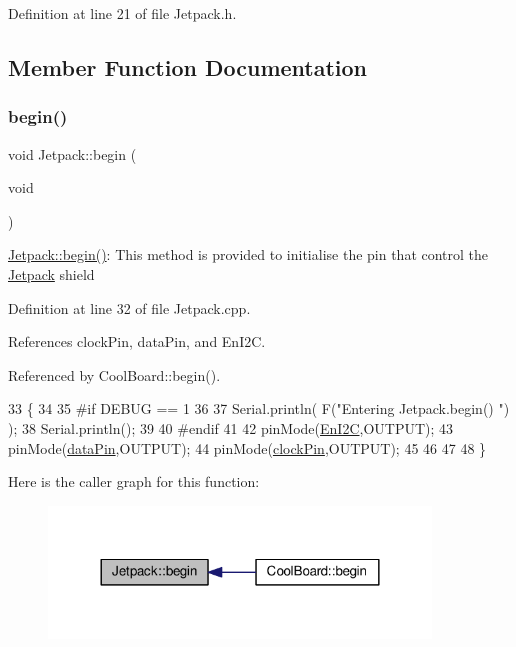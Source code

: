 Definition at line 21 of file Jetpack.\+h.



\subsection{Member Function Documentation}
\mbox{\label{classJetpack_a5a53e1ebf7aaf3bf3e0d37ea64ca09a7}} 
\subsubsection{\texorpdfstring{begin()}{begin()}}
{\footnotesize\ttfamily void Jetpack\+::begin (\begin{DoxyParamCaption}\item[{void}]{ }\end{DoxyParamCaption})}

\hyperlink{classJetpack_a5a53e1ebf7aaf3bf3e0d37ea64ca09a7}{Jetpack\+::begin()}\+: This method is provided to initialise the pin that control the \hyperlink{classJetpack}{Jetpack} shield 

Definition at line 32 of file Jetpack.\+cpp.



References clock\+Pin, data\+Pin, and En\+I2C.



Referenced by Cool\+Board\+::begin().


\begin{DoxyCode}
33 \{
34 
35 \textcolor{preprocessor}{#if DEBUG == 1 }
36  
37     Serial.println( F(\textcolor{stringliteral}{"Entering Jetpack.begin() "}) );
38     Serial.println();
39 
40 \textcolor{preprocessor}{#endif}
41 
42     pinMode(\hyperlink{classJetpack_a81df984fb4cea98c71aa1a1cfcdfe814}{EnI2C},OUTPUT);
43     pinMode(\hyperlink{classJetpack_a3d669a56e93c71dd25f970d4ed7d0c00}{dataPin},OUTPUT);
44     pinMode(\hyperlink{classJetpack_a58ebb991f358f3ae94e82148b0221b5a}{clockPin},OUTPUT);
45     
46     
47 
48 \}
\end{DoxyCode}
Here is the caller graph for this function\+:
\nopagebreak
\begin{figure}[H]
\begin{center}
\leavevmode
\includegraphics[width=288pt]{classJetpack_a5a53e1ebf7aaf3bf3e0d37ea64ca09a7_icgraph}
\end{center}
\end{figure}
\mbox{\label{classJetpack_ab065ee83e244265a2223a22f3ee4a719}} 

